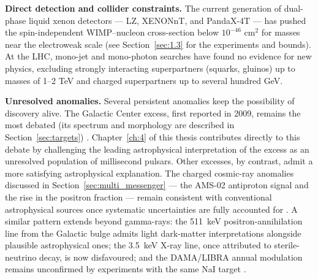 \textbf{Direct detection and collider constraints.}
The current generation of dual-phase liquid xenon detectors --- LZ, XENONnT, and PandaX-4T --- has pushed the spin-independent WIMP--nucleon cross-section below $10^{-46}$ cm$^2$ for masses near the electroweak scale (see Section~\ref{sec:1.3} for the experiments and bounds).
At the LHC, mono-jet and mono-photon searches have found no evidence for new physics, excluding strongly interacting superpartners (squarks, gluinos) up to masses of 1--2 TeV and charged superpartners up to several hundred GeV.

\textbf{Unresolved anomalies.}
Several persistent anomalies keep the possibility of discovery alive.
The Galactic Center excess, first reported in 2009, remains the most debated (its spectrum and morphology are described in Section~\ref{sec:targets}) \cite{Daylan:2014rsa,Cirelli:2024ssz}.
Chapter~\ref{ch:4} of this thesis contributes directly to this debate by challenging the leading astrophysical interpretation of the excess as an unresolved population of millisecond pulsars.
Other excesses, by contrast, admit a more satisfying astrophysical explanation.
The charged cosmic-ray anomalies discussed in Section~\ref{sec:multi_messenger} --- the AMS-02 antiproton signal and the rise in the positron fraction --- remain consistent with conventional astrophysical sources once systematic uncertainties are fully accounted for \cite{Hooper:2024}.
A similar pattern extends beyond gamma-rays: the 511~keV positron-annihilation line from the Galactic bulge admits light dark-matter interpretations alongside plausible astrophysical ones; the 3.5~keV X-ray line, once attributed to sterile-neutrino decay, is now disfavoured; and the DAMA/LIBRA annual modulation remains unconfirmed by experiments with the same NaI target \cite{Cirelli:2024ssz}.

